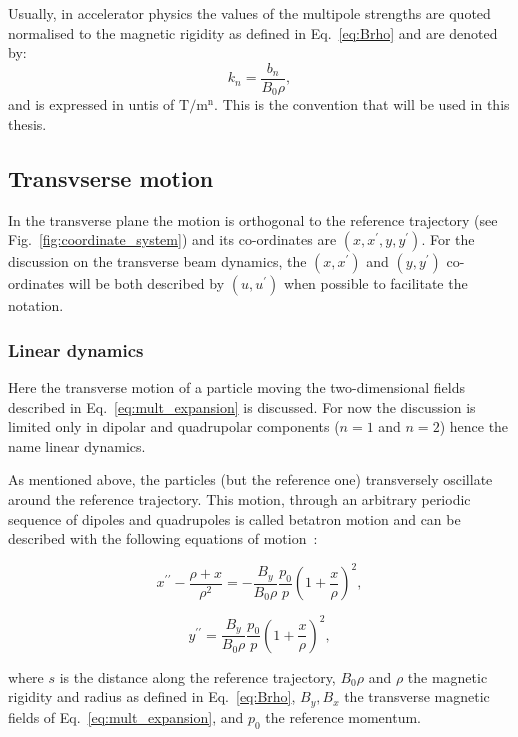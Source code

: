 Usually, in accelerator physics the values of the multipole strengths are quoted normalised to the magnetic rigidity as defined in Eq.~\eqref{eq:Brho} and are denoted by:
\begin{equation}\label{eq:kn}
    k_n = \frac{b_n}{B_0 \rho},
\end{equation}
and is expressed in untis of  $\mathrm{T/m^{n}}$. This is the convention that will be used in this thesis.

\subsection{Transvserse motion}
In the transverse plane the motion is orthogonal to the reference trajectory (see Fig.~\ref{fig:coordinate_system}) and its co-ordinates are $(x, x^\prime, y, y^\prime)$. For the discussion on the transverse beam dynamics, the $(x, x^\prime)$ and $(y, y^\prime)$ co-ordinates will be both described by $(u, u^\prime)$ when possible to facilitate the notation.

\subsubsection{Linear dynamics}
Here the transverse motion of a particle moving the two-dimensional fields described in Eq.~\eqref{eq:mult_expansion} is discussed. For now the discussion is limited only in dipolar and quadrupolar components ($n=1$ and $n=2$) hence the name linear dynamics.

As mentioned above, the particles (but the reference one) transversely  oscillate around the reference trajectory. This motion, through an arbitrary periodic sequence of dipoles and quadrupoles is called betatron motion and can be described with the following equations of motion~\cite{Lee:1425444}:

\begin{equation}\label{eq:transverse_eq_x}
    x^{\prime \prime} - \frac{\rho+x}{\rho^2} = - \frac{B_y}{B_0 \rho} \frac{p_0}{p} \left (  1+ \frac{x}{\rho} \right )^2, 
\end{equation}

\begin{equation}\label{eq:transverse_eq_y}
    y^{\prime \prime} = \frac{B_y}{B_0 \rho} \frac{p_0}{p}  \left (  1+ \frac{x}{\rho} \right )^2, 
\end{equation}

where $s$ is the distance along the reference trajectory, $B_0 \rho$ and $\rho$ the magnetic rigidity and radius as defined in Eq.~\eqref{eq:Brho},  $B_y, B_x$ the transverse magnetic fields of Eq.~\eqref{eq:mult_expansion}, and $p_0$ the reference momentum.

